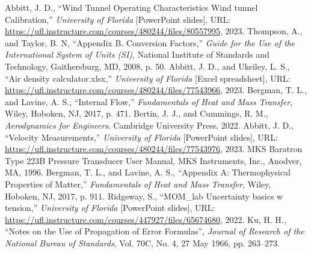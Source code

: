 \documentclass[journal,letterpaper]{IEEEtran}
\begin{document}
\begin{thebibliography}{99}
     Abbitt, J. D., ``Wind Tunnel Operating Characteristics
    Wind tunnel Calibration,'' \textit{University of Florida} [PowerPoint slides], URL: \url{https://ufl.instructure.com/courses/480244/files/80557995}, 2023.
     Thompson, A., and Taylor, B. N, ``Appendix B. Conversion Factors,'' \textit{Guide for the Use of the International System of Units (SI)}, National Institute of Standards and Technology, Gaithersburg, MD, 2008, p. 50.
     Abbitt, J. D., and Ukeiley, L. S., ``Air density calculator.xlsx,'' \textit{University of Florida} [Excel spreadsheet], URL: \url{https://ufl.instructure.com/courses/480244/files/77543966}, 2023.
     Bergman, T. L., and Lavine, A. S., ``Internal Flow,'' \textit{Fundamentals of Heat and Mass Transfer}, Wiley, Hoboken, NJ, 2017, p. 471.
     Bertin, J. J., and Cummings, R. M., \textit{Aerodynamics for Engineers}. Cambridge University Press, 2022.
     Abbitt, J. D., ``Velocity Measurements,'' \textit{University of Florida} [PowerPoint slides], URL: \url{https://ufl.instructure.com/courses/480244/files/77543976}, 2023.
     MKS Baratron Type 223B Pressure Transducer User Manual, MKS Instruments, Inc., Anodver, MA, 1996.
     Bergman, T. L., and Lavine, A. S., ``Appendix A: Thermophysical Properties of Matter,'' \textit{Fundamentals of Heat and Mass Transfer}, Wiley, Hoboken, NJ, 2017, p. 911.
     Ridgeway, S., ``MOM\_lab Uncertainty basics w tension,'' \textit{University of Florida} [PowerPoint slides], URL: \url{https://ufl.instructure.com/courses/447927/files/65674680}, 2022.
     Ku, H. H., ``Notes on the Use of Propagation of Error Formulas'', \textit{Journal of Research of the National Bureau of Standards}, Vol. 70C, No. 4, 27 May 1966, pp. 263--273.
\end{thebibliography}
\end{document}
